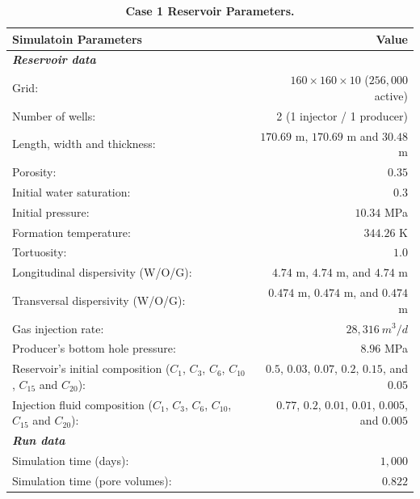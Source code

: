 \FloatBarrier
\begin{center}
\begin{table}[h!]
\begin{adjustbox}{width=0.8\textwidth}
    \begin{threeparttable}
    \caption{\textbf{Case 1 Reservoir Parameters\supercite{fernandes}.}}
    \label{case1}
        \begin{tabular}{l r }
            \toprule
            Simulatoin Parameters & Value\\
            \midrule
	\rowcolor{red!20}\textit{\textbf{Reservoir data}}      & \\
	Grid:      &           $160\times160\times10$ ($256,000$ active) \\
	\rowcolor{blue!5}Number of wells:      &  2 (1 injector / 1 producer) \\
	Length, width and thickness:      & $170.69$ m, $170.69$ m and $30.48$ m\\
	\rowcolor{blue!5}Porosity:       &          $0.35$ \\
	Initial water saturation:    & $0.3$ \\      
	\rowcolor{blue!5}Initial pressure:    &      $10.34$ MPa\\
	Formation temperature:    & $344.26$ K     \\
	\rowcolor{blue!5}Tortuosity:    &      $1.0$ \\
	Longitudinal dispersivity (W/O/G):    & $4.74$ m, $4.74$ m, and $4.74$ m\\
	\rowcolor{blue!5}Transversal dispersivity (W/O/G):    & $0.474$ m, $0.474$ m, and $0.474$ m\\
	Gas injection rate:    &       $28,316 \ m^{3}/d$ \\
	\rowcolor{blue!5}Producer’s bottom hole pressure:    &       $8.96$ MPa\\
	Reservoir’s initial composition ($C_{1}$, $C_{3}$, $C_{6}$, $C_{10}$, $C_{15}$ and $C_{20}$): & $0.5$, $0.03$, $0.07$, $0.2$, $0.15$, and $0.05$\\
	\rowcolor{blue!5}Injection ﬂuid composition ($C_{1}$, $C_{3}$, $C_{6}$, $C_{10}$, $C_{15}$ and $C_{20}$):    &   $0.77$, $0.2$, $0.01$, $0.01$, $0.005$, and $0.005$\\
	\rowcolor{red!20}\textit{\textbf{Run data}}    &       \\
	Simulation time (days):    &  $1,000$\\
	\rowcolor{blue!5}Simulation time (pore volumes):    & $0.822$\\
            \bottomrule
        \end{tabular}
    \end{threeparttable}
\end{adjustbox}    
\end{table}
\end{center}
\FloatBarrier


